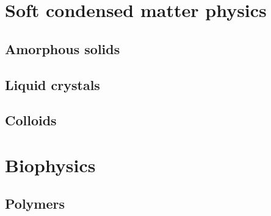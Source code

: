 \chapter{Soft condensed matter physics}
\section{Amorphous solids}
\section{Liquid crystals}
\section{Colloids}
\chapter{Biophysics}
\section{Polymers}
